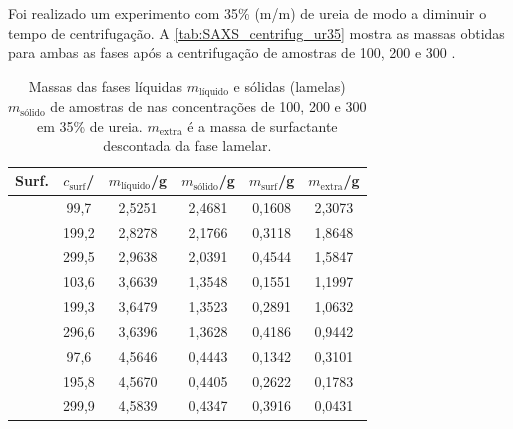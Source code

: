	Foi realizado um experimento com 35\% (m/m) de ureia de modo a diminuir o tempo de centrifugação. A \autoref{tab:SAXS_centrifug_ur35} mostra as massas obtidas para ambas as fases após a centrifugação de amostras de \CTDTAB{} 100, 200 e 300 \mM{}.
	
	\begin{table}[h]
		\IBGEtab%
		{
			\caption{Massas das fases líquidas \(m_{\text{líquido}}\) e sólidas (lamelas) \(m_{\text{sólido}}\) de amostras de \CTDTAB{} nas concentrações de 100, 200 e 300 \mM{} em 35\% de ureia. \(m_{\text{extra}}\) é a massa de surfactante descontada da fase lamelar.}
			
			\label{tab:SAXS_centrifug_ur35}
		}
		{
			\begin{tabular}{c c | c c c c}
				\toprule
				        Surf.          & \(c_{\text{surf}}\)/\mM & \(m_{\text{líquido}}\)/g & \(m_{\text{sólido}}\)/g & \(m_{\text{surf}}\)/g & \(m_{\text{extra}}\)/g \\ \midrule
				\multirow{3}{*}{\CTAB} & 99,7                    & 2,5251                   & 2,4681                  & 0,1608                & 2,3073                 \\
				                       & 199,2                   & 2,8278                   & 2,1766                  & 0,3118                & 1,8648                 \\
				                       & 299,5                   & 2,9638                   & 2,0391                  & 0,4544                & 1,5847                 \\ \midrule
				\multirow{3}{*}{\TTAB} & 103,6                   & 3,6639                   & 1,3548                  & 0,1551                & 1,1997                 \\
				                       & 199,3                   & 3,6479                   & 1,3523                  & 0,2891                & 1,0632                 \\
				                       & 296,6                   & 3,6396                   & 1,3628                  & 0,4186                & 0,9442                 \\ \midrule
				\multirow{3}{*}{\DTAB} & 97,6                    & 4,5646                   & 0,4443                  & 0,1342                & 0,3101                 \\
				                       & 195,8                   & 4,5670                   & 0,4405                  & 0,2622                & 0,1783                 \\
				                       & 299,9                   & 4,5839                   & 0,4347                  & 0,3916                & 0,0431                 \\ \bottomrule
			\end{tabular}
		}
		{}
	\end{table}
	
